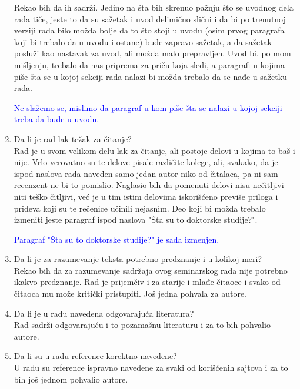 \documentclass[a4paper]{report}
\newcommand{\odgovor}[1]{\textcolor{blue}{#1}}
\begin{document}
\begin{enumerate}
Rekao bih da ih sadrži. Jedino na šta bih skrenuo pažnju što se uvodnog dela rada tiče, jeste to da su 
sažetak i uvod delimično slični i da bi po trenutnoj verziji rada bilo možda bolje da to što stoji u 
uvodu (osim prvog paragrafa koji bi trebalo da u uvodu i ostane) bude zapravo sažetak, a da sažetak 
posluži kao nastavak za uvod, ali možda malo prepravljen. Uvod bi, po mom mišljenju, trebalo da nas 
priprema za priču koja sledi, a paragrafi u kojima piše šta se u kojoj sekciji rada nalazi bi možda 
trebalo da se nađe u sažetku rada. 

\odgovor{Ne slažemo se, mislimo da paragraf u kom piše šta se nalazi u kojoj sekciji treba da bude u uvodu.}

\item Da li je rad lak-težak za čitanje?\\

Rad je u svom velikom delu lak za čitanje, ali postoje delovi u kojima to baš i nije. Vrlo verovatno su 
te delove pisale različite kolege, ali, svakako, da je ispod naslova rada naveden samo jedan autor niko 
od čitalaca, pa ni sam recenzent ne bi to pomislio. Naglasio bih da pomenuti delovi nisu nečitljivi niti 
teško čitljivi, već je u tim istim delovima iskorišćeno previše priloga i prideva koji su te rečenice 
učinili nejasnim. Deo koji bi možda trebalo izmeniti jeste paragraf ispod naslova "Šta su to doktorske 
studije?".

\odgovor{Paragraf "Šta su to doktorske 
studije?"{} je sada izmenjen.}

\item Da li je za razumevanje teksta potrebno predznanje i u kolikoj meri?\\

Rekao bih da za razumevanje sadržaja ovog seminarskog rada nije potrebno ikakvo predznanje. Rad je 
prijemčiv i za starije i mlađe čitaoce i svako od čitaoca mu može kritički pristupiti. Još jedna pohvala za autore.

\item Da li je u radu navedena odgovarajuća literatura?\\

Rad sadrži odgovarajuću i to pozamašnu literaturu i za to bih pohvalio autore.

\item Da li su u radu reference korektno navedene?\\

U radu su reference ispravno navedene za svaki od korišćenih sajtova i za to bih još jednom pohvalio autore.


\end{enumerate}
\end{document}
